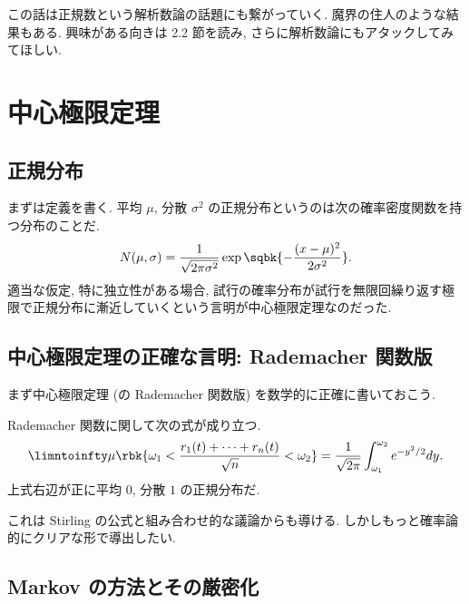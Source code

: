 \documentclass[openany, a4paper, oneside]{jsbook}
\begin{document}
この話は正規数という解析数論の話題にも繋がっていく.
魔界の住人のような結果もある.
興味がある向きは \cite{MarkKac1} 2.2 節を読み, さらに解析数論にもアタックしてみてほしい.
\section{中心極限定理}

\subsection{正規分布}

まずは定義を書く.
平均 $\mu$, 分散 $\sigma^2$ の正規分布というのは次の確率密度関数を持つ分布のことだ.
\begin{align}
 N (\mu, \sigma)
 =
 \frac{1}{\sqrt{2 \pi \sigma^2}} \exp \sqbk{- \frac{(x - \mu)^2}{2 \sigma^2}}.
\end{align}
適当な仮定, 特に独立性がある場合, 試行の確率分布が試行を無限回繰り返す極限で正規分布に漸近していくという言明が中心極限定理なのだった.
\subsection{中心極限定理の正確な言明: Rademacher 関数版}

まず中心極限定理 (の Rademacher 関数版) を数学的に正確に書いておこう.
\begin{thm}
 Rademacher 関数に関して次の式が成り立つ.
 \begin{align}
  \limntoinfty \mu \rbk{\omega_1 < \frac{r_1 (t) + \cdots + r_n (t)}{\sqrt{n}} < \omega_2}
  =
  \frac{1}{\sqrt{2 \pi}} \int_{\omega_1}^{\omega_2} e^{- y^2 / 2} dy.
 \end{align}
 上式右辺が正に平均 $0$, 分散 $1$ の正規分布だ.
\end{thm}
これは Stirling の公式と組み合わせ的な議論からも導ける.
しかしもっと確率論的にクリアな形で導出したい.
\subsection{Markov の方法とその厳密化}
\end{document}
